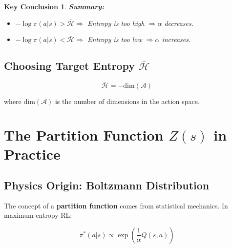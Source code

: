 \documentclass[12pt,a4paper]{article}
\theoremstyle{noteplain}
\newtheorem{important}{Key Conclusion}[section]
\theoremstyle{noteexercise}
\begin{document}
\begin{important}
\textbf{Summary:}

\begin{itemize}
  \item $- \log\pi(a|s) > \bar{\mathcal{H}} \Longrightarrow$ Entropy is too high $\Longrightarrow \alpha$ decreases.
  \item $- \log\pi(a|s) < \bar{\mathcal{H}} \Longrightarrow$ Entropy is too low $\Longrightarrow \alpha$ increases.
\end{itemize}

\end{important}



\subsection{Choosing Target Entropy $\bar{\mathcal{H}}$}\label{ssec:target-entropy}



\begin{equation}\label{eq:target-entropy}
\boxed{\bar{\mathcal{H}} = -\text{dim}(\mathcal{A})}
\end{equation}

where $\text{dim}(\mathcal{A})$ is the number of dimensions in the action space.






\section{The Partition Function $Z(s)$ in Practice}\label{sec:partition-fn}



\subsection{Physics Origin: Boltzmann Distribution}\label{ssec:boltzmann}



The concept of a \textbf{partition function} comes from statistical mechanics. In maximum entropy RL:

$$\pi^*(a|s) \propto \exp\left(\frac{1}{\alpha}Q(s,a)\right)$$
\end{document}
